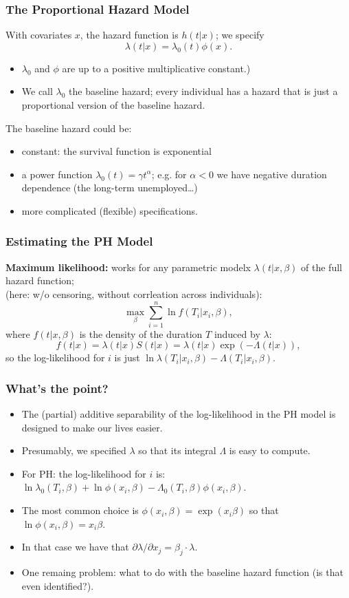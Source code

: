 \documentclass[xcolor=pdftex,dvipsnames,table,mathserif]{beamer}
\begin{document}
\begin{frame}
\frametitle{The Proportional Hazard  Model}
With covariates $x$, the hazard function is $h(t \vert x)$; we specify
\[
\lambda(t \vert x)=\lambda_0(t)\phi(x).
\]
\begin{itemize}
\item $\lambda_0$ and $\phi$ are up to a positive multiplicative constant.)
\item  We call $\lambda_0$ the \alert{ baseline hazard}; every individual has
a hazard that is just a proportional version of the baseline hazard.
\end{itemize}
The baseline hazard could be:
\begin{itemize}
\item constant: the survival function is exponential
\item a power function $\lambda_0(t)=\gamma t^{\alpha}$; e.g. for
$\alpha<0 $ we have \alert{negative duration dependence} (the
long-term unemployed\ldots)
\item more complicated (flexible) specifications.
\end{itemize}
\end{frame}



\begin{frame}
\frametitle{Estimating the PH Model}
{\bf Maximum likelihood:} works for any parametric modelx
$\lambda(t \vert x,\beta)$ of the full hazard function;\\
(here: w/o censoring, without corrleation across individuals):
\[
\max_{\beta} \sum_{i=1}^n \ln f(T_i \vert x_i,\beta),
\]
where $f(t \vert x,\beta)$ is the density of the duration $T$ induced by
$\lambda$:
\[
f(t \vert x)=\lambda(t \vert x)S(t \vert x)=\lambda(t \vert x)\exp(-\Lambda(t \vert x)),
\]
so the log-likelihood for $i$ is just $\ln
\lambda(T_i \vert x_i,\beta)-\Lambda(T_i \vert x_i,\beta)$.
\end{frame}

\begin{frame}
\frametitle{What's the point?}
\begin{itemize}
\item The (partial) additive separability of the log-likelihood in the PH model is designed to make our lives easier.
\item Presumably, we specified $\lambda$ so that its integral $\Lambda$ is easy to
compute. 
\item For PH: the log-likelihood for $i$ is:\\
$\ln \lambda_0(T_i,\beta)+\ln\phi(x_i,\beta)-\Lambda_0(T_i,\beta)\phi(x_i,\beta)$.
\item The most common choice is $\phi(x_i,\beta) = \exp(x_i \beta)$ so that $\ln\phi(x_i,\beta) = x_i \beta$.
\item In that case we have that $\partial \lambda/ \partial x_j = \beta_j \cdot \lambda$.
\item One remaing problem: what to do with the baseline hazard function (is that even identified?).
\end{itemize}
\end{frame}
\end{document}
